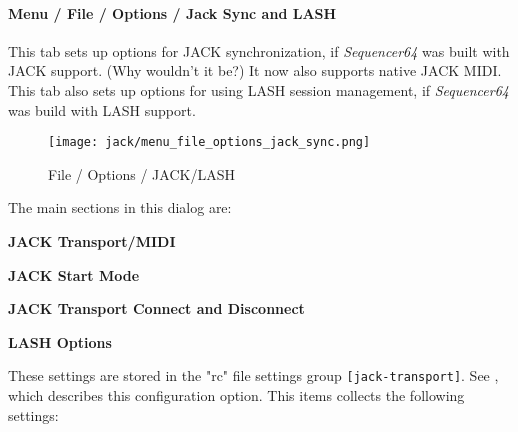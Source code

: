 \paragraph{Menu / File / Options / Jack Sync and LASH}
\label{paragraph:seq64_menu_file_options_jack_sync}

   This tab sets up options for JACK synchronization, if \textsl{Sequencer64}
   was built with JACK support.  (Why wouldn't it be?)
   It now also supports native JACK MIDI.
   This tab also sets up options for using LASH session management, if
   \textsl{Sequencer64} was build with LASH support.

\begin{figure}[H]
   \centering 
   \texttt{[image: jack/menu\_file\_options\_jack\_sync.png]}
   \caption{File / Options / JACK/LASH}
   \label{fig:seq64_menu_file_options_jack_sync}
\end{figure}

   The main sections in this dialog are:

   \begin{enumber}
      \item \textbf{JACK Transport/MIDI}
      \item \textbf{JACK Start Mode}
      \item \textbf{JACK Transport Connect and Disconnect}
      \item \textbf{LASH Options}
   \end{enumber}

   \setcounter{ItemCounter}{0}      %

   These settings are stored in the "rc" file settings group
   \texttt{[jack-transport]}.
   See ,
   which describes this configuration option.
   This items collects the following settings:

